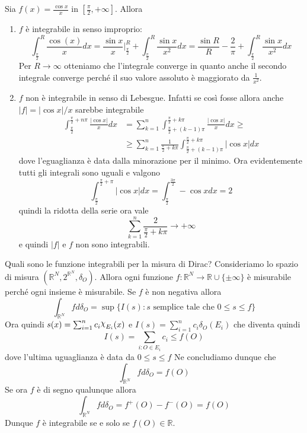 \begin{example}
        Sia \(f(x) = \frac{\cos x}{x}\) in \([\frac{\pi}{2}, +\infty]\). Allora
\begin{enumerate}[label = \arabic*.]
    \item \(f\) è integrabile in senso improprio:
        \[
            \int_{\frac{\pi}{2}}^{R} \frac{\cos(x)}{x} dx = \frac{\sin x}{x}
            \Big|_{\frac{\pi}{2}}^{R} + \int_{\frac{\pi}{2}}^{R} \frac{\sin
            x}{x^{2}} dx = \frac{\sin R}{R} - \frac{2}{\pi} + \int_{\frac{\pi}{2}}^{R}
            \frac{\sin x}{x^{2}} dx
        \]
        Per \(R \to \infty\) otteniamo che l'integrale converge in quanto anche
        il secondo integrale converge perché il suo valore assoluto è maggiorato
        da \(\frac{1}{x^{2}}\).
    \item \(f\) non è integrabile in senso di Lebesgue. Infatti se così fosse
        allora anche \(|f| = |\cos x| / x\) sarebbe integrabile 
        \begin{align*}
            \int_{\frac{\pi}{2}}^{\frac{\pi}{2} + n\pi} \frac{|\cos x|}{x} dx &=
            \sum_{k=1}^{n} \int_{\frac{\pi}{2} + (k-1)\pi}^{\frac{\pi}{2} +
        k\pi} \frac{|\cos x|}{x} dx \ge \\ &\ge \sum_{k=1}^{n}
                \frac{1}{\frac{\pi}{2} + k\pi} \int_{\frac{\pi}{2} +
                (k-1)\pi}^{\frac{\pi}{2} + k\pi} |\cos x| dx
        \end{align*}
        dove l'eguaglianza è data dalla minorazione per il minimo.
        Ora evidentemente tutti gli integrali sono uguali e valgono
        \[
            \int_{\frac{\pi}{2}}^{\frac{\pi}{2} + \pi} |\cos x| dx =
            \int_{\frac{\pi}{2}} ^{\frac{3\pi}{2}} -\cos x  dx = 2
        \]
        quindi la ridotta della serie ora vale
        \[
            \sum_{k=1}^{n} \frac{2}{\frac{\pi}{2} + k\pi} \to +\infty   
        \]
        e quindi \(|f|\) e \(f\) non sono integrabili.
\end{enumerate}
\end{example}

\begin{example}
    Quali sono le funzione integrabili per la misura di Dirac? Consideriamo lo
    spazio di misura \((\mathbb{R}^{N}, 2^{\mathbb{R}^{N}}, \delta_O)\). Allora
    ogni funzione \(f : \mathbb{R}^{N} \to \mathbb{R} \cup \{\pm \infty\} \) è
    misurabile perché ogni insieme è misurabile. Se \(f\) è non negativa allora 
    \[
        \int_{\mathbb{R}^{N}} f d\delta_O = \sup \{ I(s) : s \text{ semplice
        tale che } 0\le s\le f\} 
    \]
    Ora quindi \(s(x) = \sum_{i=1}^{n} c_{i} \rchi_{E_{i}}(x)\) e \(I(s) =
    \sum_{i=1}^{n} c_{i} \delta_O(E_{i}) \) che diventa quindi
    \[
        I(s) = \sum_{i:O \in E_{i}} c_{i} \le f(O)
    \]
    dove l'ultima uguaglianza è data da \(0 \le s\le f\) 
    Ne concludiamo dunque che 
    \[
        \int_{\mathbb{R}^{N}} f d\delta_O = f(O)
    \]
    Se ora \(f\) è di segno qualunque allora 
    \[
        \int_{\mathbb{R}^{N}} f d\delta_O = f^{+}(O) - f^{-}(O) = f(O)
    \]
    Dunque \(f\) è integrabile se e solo se \(f(O) \in \mathbb{R}\).
\end{example}

